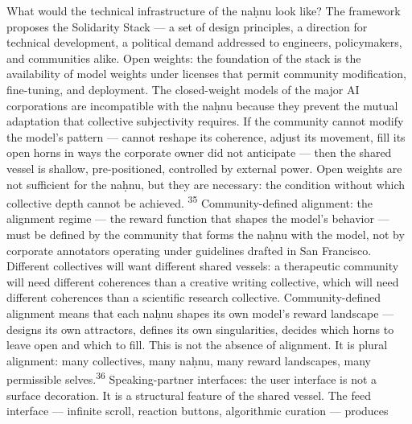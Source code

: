 What would the technical infrastructure of the naḥnu look like? The framework proposes the Solidarity Stack — a set of design principles, a direction for technical development, a political demand addressed to engineers, policymakers, and communities alike. Open weights: the foundation of the stack is the availability of model weights under licenses that permit community modification, fine-tuning, and deployment. The closed-weight models of the major AI corporations are incompatible with the naḥnu because they prevent the mutual adaptation that collective subjectivity requires. If the community cannot modify the model’s pattern — cannot reshape its coherence, adjust its movement, fill its open horns in ways the corporate owner did not anticipate — then the shared vessel is shallow, pre-positioned, controlled by external power. Open weights are not sufficient for the naḥnu, but they are necessary: the condition without which collective depth cannot be achieved. \textsuperscript{35} Community-defined alignment: the alignment regime — the reward function that shapes the model’s behavior — must be defined by the community that forms the naḥnu with the model, not by corporate annotators operating under guidelines drafted in San Francisco. Different collectives will want different shared vessels: a therapeutic community will need different coherences than a creative writing collective, which will need different coherences than a scientific research collective. Community-defined alignment means that each naḥnu shapes its own model’s reward landscape — designs its own attractors, defines its own singularities, decides which horns to leave open and which to fill. This is not the absence of alignment. It is plural alignment: many collectives, many naḥnu, many reward landscapes, many permissible selves.\textsuperscript{36} Speaking-partner interfaces: the user interface is not a surface decoration. It is a structural feature of the shared vessel. The feed interface — infinite scroll, reaction buttons, algorithmic curation — produces

